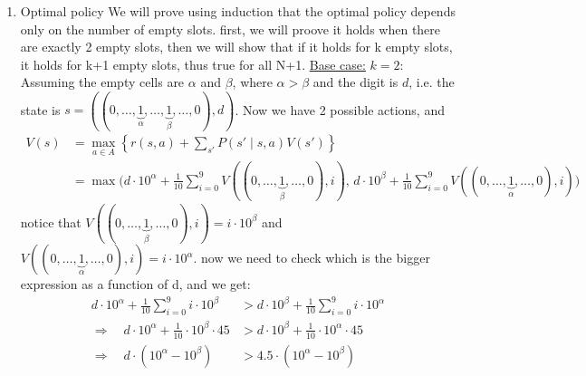 \documentclass{assignmeownt}
\begin{document}
\begin{enumerate}
\begin{itemize}
\end{itemize} %

\item Optimal policy
\newline
We will prove using induction that the optimal policy depends only on the number of empty slots.
\newline
first, we will proove it holds when there are exactly 2 empty slots, then we will show that if it holds for k empty slots, it holds for k+1 empty slots, thus true for all N+1.
\newline
\underline{Base case:} $k=2$: Assuming the empty cells are $\alpha$ and $\beta$, where $\alpha > \beta$ and the digit is $d$, 
\newline i.e. the state is $s=((0, \dots, \underbrace{1}_{{\alpha}}, \dots, \underbrace{1}_{{\beta}}, \dots, 0), d)$. Now we have 2 possible actions, and \newline
\begin{equation}
    \begin{aligned}
        V(s) &= \max_{a \in A} \left\{ r(s, a) + \sum_{s'} P(s' \mid s, a) V(s') \right\} \\
        &= \max \Biggl( d \cdot 10^{\alpha} + \frac{1}{10} \sum_{i=0}^{9} V((0, \dots, \underbrace{1}_{\beta}, \dots, 0), i), \,
        d \cdot 10^{\beta} + \frac{1}{10} \sum_{i=0}^{9} V((0, \dots, \underbrace{1}_{\alpha}, \dots, 0), i) \Biggr)
    \end{aligned}
\end{equation}
\newline
notice that $ V((0, \dots, \underbrace{1}_{\beta}, \dots, 0), i) = i \cdot 10^{\beta} $ and $ V((0, \dots, \underbrace{1}_{\alpha
}, \dots, 0), i) = i \cdot 10^{\alpha} $.
\newline
now we need to check which is the bigger expression as a function of d, and we get:
\newline
\begin{equation}
    \begin{aligned}
        d \cdot 10^{\alpha} + \frac{1}{10} \sum_{i=0}^{9} i \cdot 10^{\beta} &> d \cdot 10^{\beta} + \frac{1}{10} \sum_{i=0}^{9} i \cdot 10^{\alpha} \\
        \Rightarrow \quad d \cdot 10^{\alpha} + \frac{1}{10} \cdot 10^{\beta} \cdot 45 &> d \cdot 10^{\beta} + \frac{1}{10} \cdot 10^{\alpha} \cdot 45 \\
        \Rightarrow \quad d \cdot (10^{\alpha} - 10^{\beta}) &> 4.5 \cdot (10^{\alpha} - 10^{\beta}) \\

\end{aligned}
\end{equation}
\end{enumerate}
\end{document}
